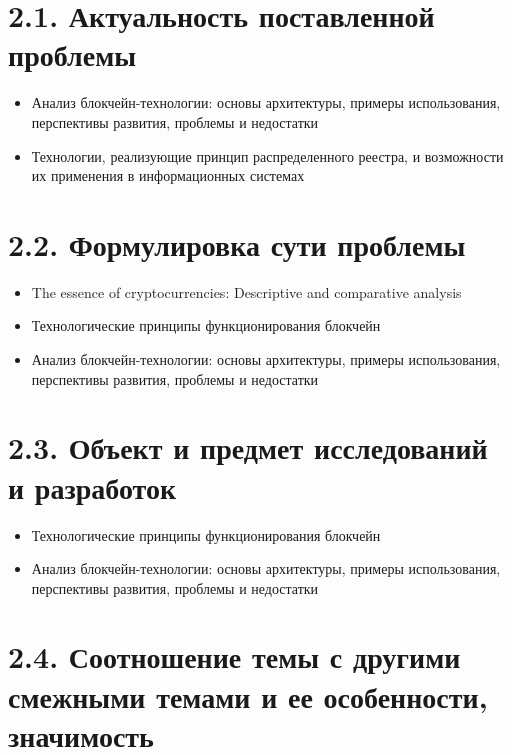 \documentclass[a4paper, 12pt]{report}		%
\begin{document}
\section*{2.1. Актуальность поставленной проблемы}

\begin{itemize}
\item Анализ блокчейн-технологии: основы архитектуры, примеры использования, перспективы развития, проблемы и недостатки
\item Технологии, реализующие принцип распределенного реестра, и возможности их применения в информационных системах
\end{itemize}

\section*{2.2. Формулировка сути проблемы}

\begin{itemize}
\item The essence of cryptocurrencies: Descriptive and comparative analysis
\item Технологические принципы функционирования блокчейн
\item Анализ блокчейн-технологии: основы архитектуры, примеры использования, перспективы развития, проблемы и недостатки
\end{itemize}

\section*{2.3. Объект и предмет исследований и разработок}

\begin{itemize}
\item Технологические принципы функционирования блокчейн
\item Анализ блокчейн-технологии: основы архитектуры, примеры использования, перспективы развития, проблемы и недостатки
\end{itemize}

\section*{2.4. Соотношение темы с другими смежными темами и ее особенности, значимость}
\end{document}
